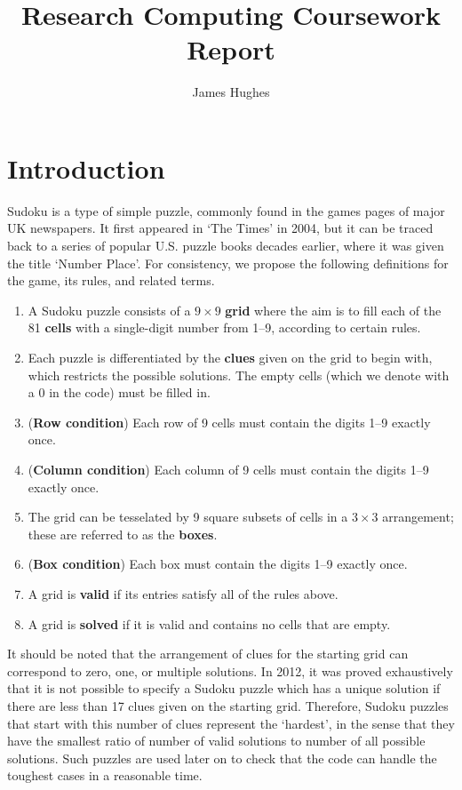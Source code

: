 \documentclass[12pt]{article}
\title{Research Computing Coursework Report}
\author{James Hughes}
\begin{document}
\maketitle
\newpage


\section*{Introduction}

Sudoku is a type of simple puzzle, commonly found in the games pages of major UK newspapers.
It first appeared in `The Times' in 2004, but it can be traced back to a series of popular U.S. puzzle books decades earlier, where it was given the title `Number Place'\cite{sudoku}.
For consistency, we propose the following definitions for the game, its rules, and related terms.

\begin{enumerate}
    \item A Sudoku puzzle consists of a $9\times9$ \textbf{grid} where the aim is to fill each of the 81 \textbf{cells} with a single-digit number from 1--9, according to certain rules.
    \item Each puzzle is differentiated by the \textbf{clues} given on the grid to begin with, which restricts the possible solutions. The empty cells (which we denote with a $0$ in the code) must be filled in.
    \item (\textbf{Row condition}) Each row of 9 cells must contain the digits 1--9 exactly once.
    \item (\textbf{Column condition}) Each column of 9 cells must contain the digits 1--9 exactly once.
    \item The grid can be tesselated by 9 square subsets of cells in a $3\times3$ arrangement; these are referred to as the \textbf{boxes}.
    \item (\textbf{Box condition}) Each box must contain the digits 1--9 exactly once.
    \item A grid is \textbf{valid} if its entries satisfy all of the rules above.
    \item A grid is \textbf{solved} if it is valid and contains no cells that are empty.
\end{enumerate}

It should be noted that the arrangement of clues for the starting grid can correspond to zero, one, or multiple solutions.
In 2012, it was proved exhaustively that it is not possible to specify a Sudoku puzzle which has a unique solution if there are less than 17 clues given on the starting grid\cite{17min}.
Therefore, Sudoku puzzles that start with this number of clues represent the `hardest', in the sense that they have the smallest ratio of number of valid solutions to number of all possible solutions.
Such puzzles are used later on to check that the code can handle the toughest cases in a reasonable time.
\end{document}
